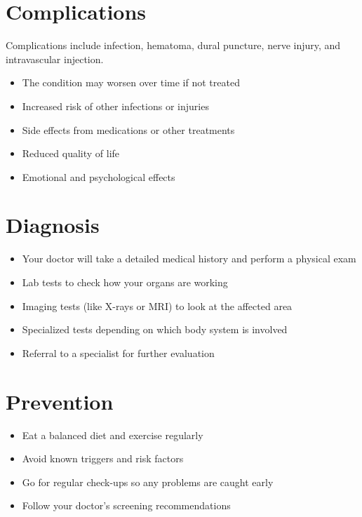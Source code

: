 \section{Complications}
Complications include infection, hematoma, dural puncture, nerve injury, and intravascular injection.

\begin{itemize}[noitemsep]
  \item The condition may worsen over time if not treated
  \item Increased risk of other infections or injuries
  \item Side effects from medications or other treatments
  \item Reduced quality of life
  \item Emotional and psychological effects
\end{itemize}

\section{Diagnosis}

\begin{itemize}[noitemsep]
  \item Your doctor will take a detailed medical history and perform a physical exam
  \item Lab tests to check how your organs are working
  \item Imaging tests (like X-rays or MRI) to look at the affected area
  \item Specialized tests depending on which body system is involved
  \item Referral to a specialist for further evaluation
\end{itemize}

\section{Prevention}

\begin{itemize}[noitemsep]
  \item Eat a balanced diet and exercise regularly
  \item Avoid known triggers and risk factors
  \item Go for regular check-ups so any problems are caught early
  \item Follow your doctor's screening recommendations
\end{itemize}

